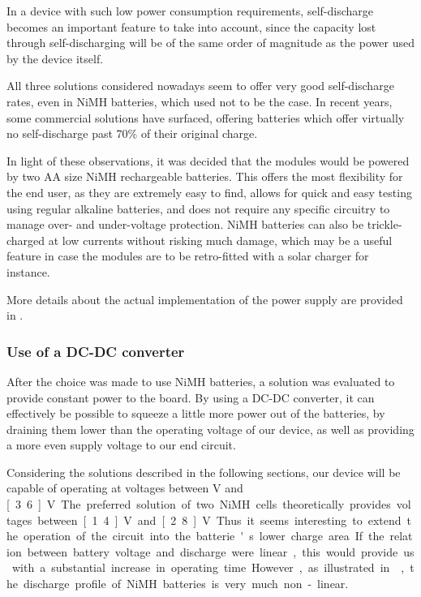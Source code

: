 In a device with such low power consumption requirements, self-discharge becomes
an important feature to take into account, since the capacity lost through
self-discharging will be of the same order of magnitude as the power used by the
device itself.

All three solutions considered nowadays seem to offer very good self-discharge
rates, even in NiMH batteries, which used not to be the case. In recent years,
some commercial solutions have surfaced, offering batteries which offer
virtually no self-discharge past 70\% of their original
charge\cite{testingeneloop}.

In light of these observations, it was decided that the modules would be powered
by two AA size NiMH rechargeable batteries. This offers the most flexibility for
the end user, as they are extremely easy to find, allows for quick and easy
testing using regular alkaline batteries, and does not require any specific
circuitry to manage over- and under-voltage protection. NiMH batteries can also
be trickle-charged at low currents without risking much damage, which may be a
useful feature in case the modules are to be retro-fitted with a solar charger
for instance.

More details about the actual implementation of the power supply are provided in
.

\subsubsection{Use of a DC-DC converter}
After the choice was made to use NiMH batteries, a solution was evaluated to
provide constant power to the board. By using a DC-DC converter, it can
effectively be possible to squeeze a little more power out of the batteries, by
draining them lower than the operating voltage of our device, as well as
providing a more even supply voltage to our end circuit.

Considering the solutions described in the following sections, our device will
be capable of operating at voltages between \unit[2]{V} and \unit[3.6]{V}. The
preferred solution of two NiMH cells theoretically provides voltages between
\unit[1.4]{V} and \unit[2.8]{V}. Thus it seems interesting to extend the
operation of the circuit into the batterie's lower charge area. If the relation
between battery voltage and discharge were linear, this would provide us with a
substantial increase in operating time. However, as illustrated in
, the discharge profile of NiMH batteries is very much
non-linear.

